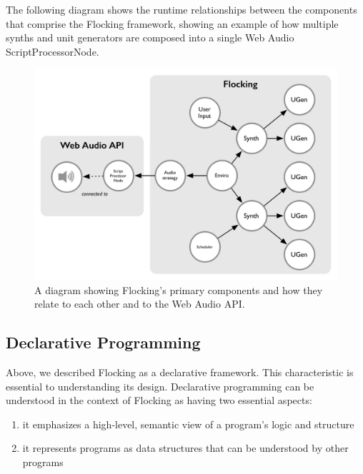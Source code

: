 \documentclass{article}
\begin{document}
The following diagram shows the runtime relationships between the components that comprise the Flocking framework, showing an example of how multiple synths and unit generators are composed into a single Web Audio ScriptProcessorNode.

\begin{figure}[h]
\centering
\includegraphics[width=0.9\columnwidth]{images/flocking-component-architecture.png}
\caption{ A diagram showing Flocking's primary components and how they relate to each other and to the Web Audio API.\label{fig:architecture}}
\end{figure}

\subsection{Declarative Programming}

Above, we described Flocking as a declarative framework. This characteristic is essential to understanding its design. Declarative programming can be understood in the context of Flocking as having two essential aspects:

\begin{enumerate}
\item it emphasizes a high-level, semantic view of a program's logic and structure
\item it represents programs as data structures that can be understood by other programs
\end{enumerate}
\end{document}
